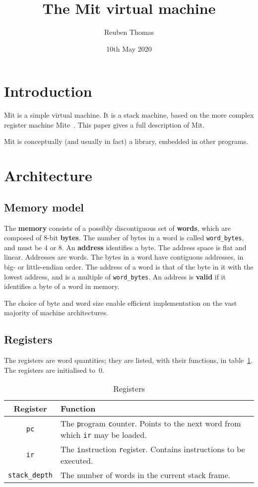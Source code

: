 \documentclass[a4paper]{article}
\title{The Mit virtual machine}
\author{Reuben Thomas}
\date{10th May 2020}
\begin{document}
\maketitle

\section{Introduction}

Mit is a simple virtual machine. It is a stack machine, based on the more complex register machine Mite~\cite{mite0}.
This paper gives a full description of Mit.

Mit is conceptually (and usually in fact) a library, embedded in other programs.


\section{Architecture}

\subsection{Memory model}

The {\bf memory} consists of a possibly discontiguous set of {\bf words}, which are composed of $8$-bit {\bf bytes}. The number of bytes in a word is called {\tt word\_bytes}, and must be $4$ or $8$. An {\bf address} identifies a byte. The address space is flat and linear. Addresses are words. The bytes in a word have contiguous addresses, in big- or little-endian order. The address of a word is that of the byte in it with the lowest address, and is a multiple of {\tt word\_bytes}. An address is {\bf valid} if it identifies a byte of a word in memory.

The choice of byte and word size enable efficient implementation on the vast majority of machine architectures.


\subsection{Registers}
\label{registers}

The registers are word quantities; they are listed, with their functions, in table~\ref{regtable}. The registers are initialised to~$0$.

\begin{table}[htbp]
\begin{center}
\begin{tabular}{cp{3.75in}} \toprule
\bf Register & \bf Function \\
 \midrule
{\tt pc} & The {\tt p}rogram {\tt c}ounter. Points to the next word from which {\tt ir} may be loaded. \\
{\tt ir} & The {\tt i}nstruction {\tt r}egister. Contains instructions to be executed. \\
{\tt stack\_depth} & The number of words in the current stack frame. \\
 \bottomrule
\end{tabular}
\caption{\label{regtable}Registers}
\end{center}
\end{table}
\end{document}
